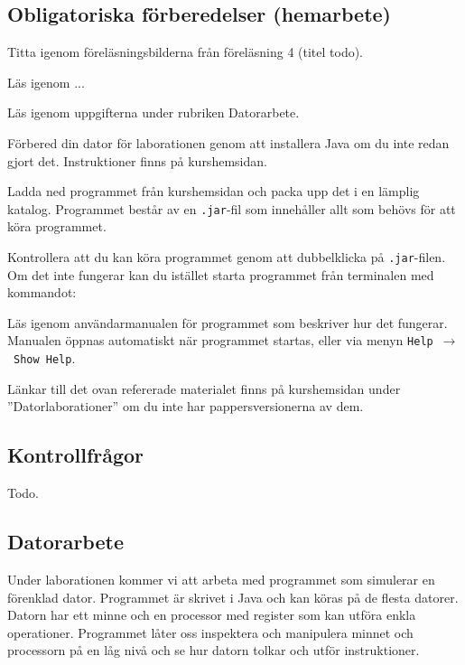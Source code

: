 \subsection*{Obligatoriska förberedelser (hemarbete)}
\begin{Hemarbete}\firmlist
    \item Titta igenom föreläsningsbilderna från föreläsning 4 (titel todo).
    \item Läs igenom ...
    \item Läs igenom uppgifterna under rubriken Datorarbete.
    \item Förbered din dator för laborationen genom att installera Java om du inte redan gjort det. Instruktioner finns på kurshemsidan.
    \item Ladda ned programmet \textbf{\progname{}} från kurshemsidan och packa upp det i en lämplig katalog. Programmet består av en \texttt{.jar}-fil som innehåller allt som behövs för att köra programmet.
    \item Kontrollera att du kan köra programmet genom att dubbelklicka på \texttt{.jar}-filen. Om det inte fungerar kan du istället starta programmet från terminalen med kommandot:
    \begin{center}
        {}
    \end{center}
    \item Läs igenom användarmanualen för programmet som beskriver hur det fungerar. Manualen öppnas automatiskt när programmet startas, eller via menyn \texttt{Help}~$\rightarrow$~\texttt{Show Help}.
\end{Hemarbete}
Länkar till det ovan refererade materialet finns på kurshemsidan under  ''Datorlaborationer'' om du inte har pappersversionerna av dem.

\subsection*{Kontrollfrågor}
\begin{Kontrollfragor}
    \item Todo.
\end{Kontrollfragor}

% 

\clearpage
\subsection*{Datorarbete}
Under laborationen kommer vi att arbeta med programmet \progname{} som simulerar en förenklad dator. Programmet är skrivet i Java och kan köras på de flesta datorer. Datorn har ett minne och en processor med register som kan utföra enkla operationer. Programmet låter oss inspektera och manipulera minnet och processorn på en låg nivå och se hur datorn tolkar och utför instruktioner.

